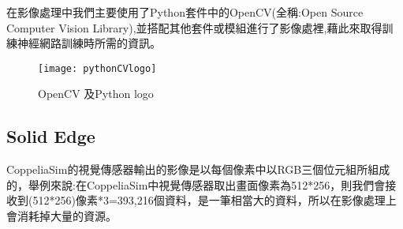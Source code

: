 \qquad 在影像處理中我們主要使用了Python套件中的OpenCV(全稱:Open Source Computer Vision Library),並搭配其他套件或模組進行了影像處裡,藉此來取得訓練神經網路訓練時所需的資訊。\\
\begin{figure}[hbt!]
\center
\texttt{[image: pythonCVlogo]}
\caption{\Large OpenCV 及Python logo}
\end{figure}

\subsection{Solid Edge}
 CoppeliaSim的視覺傳感器輸出的影像是以每個像素中以RGB三個位元組所組成的，舉例來說:在CoppeliaSim中視覺傳感器取出畫面像素為512*256，則我們會接收到(512*256)像素*3=393,216個資料，是一筆相當大的資料，所以在影像處理上會消耗掉大量的資源。\\

